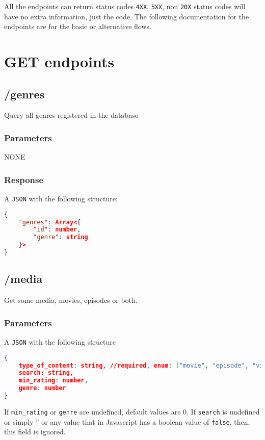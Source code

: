 \documentclass{article}
\newcommand{\mono}{\texttt}
\begin{document}
	All the endpoints can return status codes \mono{4XX}, \mono{5XX}, non \mono{20X} status codes will have no extra information, just the code. The following documentation for the endpoints are for the basic or alternative flows.	
	
	\section{GET endpoints}	
	\subsection{/genres}
	
	Query all genres registered in the database
	
	\subsubsection{Parameters}
	NONE
	
	\subsubsection{Response}
	A \mono{JSON} with the following structure:
	
\begin{lstlisting}[language=json]
{
	"genres": Array<{
		"id": number,
		"genre": string
	}>
}
\end{lstlisting}
	

\subsection{/media}
Get some media, movies, episodes or both.

\subsubsection{Parameters}
A \mono{JSON} with the following structure

\begin{lstlisting}[language=json]
{
	type_of_content: string, //required, enum: ["movie", "episode", "video"]
	search: string,
	min_rating: number,
	genre: number
}
\end{lstlisting}

If \mono{min\_rating} or \mono{genre} are undefined, default values are 0. If \mono{search} is undefined or simply '' or any value that in Javascript has a boolean value of \mono{false}, then, this field is ignored.
\end{document}
